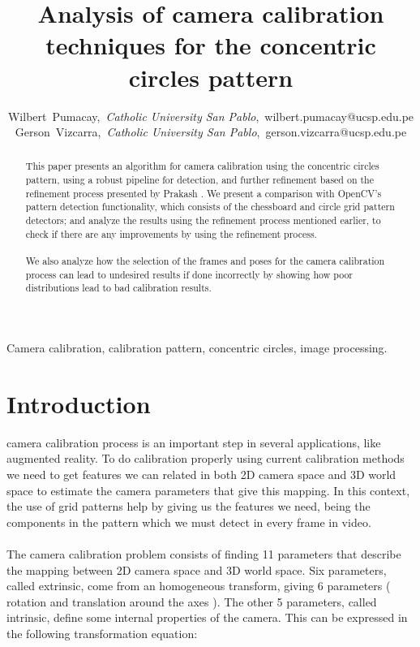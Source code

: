 \documentclass[journal]{IEEEtran}
\begin{document}
\title{Analysis of camera calibration techniques for the concentric circles pattern}

\author{Wilbert~Pumacay,~\textit{Catholic University San Pablo},~wilbert.pumacay@ucsp.edu.pe\\
        Gerson~Vizcarra,~\textit{Catholic University San Pablo},~gerson.vizcarra@ucsp.edu.pe}

\maketitle

\begin{abstract}
This paper presents an algorithm for camera calibration using the concentric circles pattern, using a robust pipeline for detection, and further refinement based on the refinement process presented by Prakash \cite{Prakash2012}. We present a comparison with OpenCV's pattern detection functionality, which consists of the chessboard and circle grid pattern detectors; and analyze the results using the refinement process mentioned earlier, to check if there are any improvements by using the refinement process.
\\
\\
We also analyze how the selection of the frames and poses for the camera calibration process can lead to undesired results if done incorrectly by showing how poor distributions lead to bad calibration results.
\end{abstract}

\begin{IEEEkeywords}
Camera calibration, calibration pattern, concentric circles, image processing.
\end{IEEEkeywords}


\section{Introduction}

 camera calibration process is an important step in several applications, like augmented reality. To do calibration properly using current calibration methods we need to get features we can related in both 2D camera space and 3D world space to estimate the camera parameters that give this mapping. In this context, the use of grid patterns help by giving us the features we need, being the components in the pattern which we must detect in every frame in video.
\\
\\
The camera calibration problem consists of finding 11 parameters that describe the mapping between 2D camera space and 3D world space. Six parameters, called extrinsic, come from an homogeneous transform, giving 6 parameters ( rotation and translation around the axes ). The other 5 parameters, called intrinsic, define some internal properties of the camera. This can be expressed in the following transformation equation:
\end{document}
